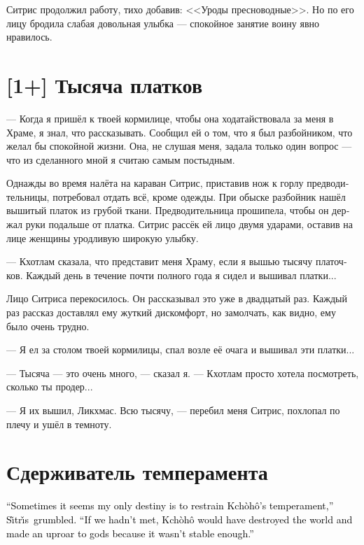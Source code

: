 \documentclass[a4paper,12pt,fleqn]{book}\usepackage{cooltooltips}\usepackage{polyglossia}\setdefaultlanguage[babelshorthands=true]{russian}\setotherlanguage{english}\defaultfontfeatures{Ligatures=TeX,Mapping=tex-text} \usepackage{xcolor}\definecolor{lightgray}{HTML}{bbbbbb}\color{lightgray}\newcommand{\ml}[3]{\textenglish{\textcolor{black}{#3}}}
\newcommand{\Kchoho}{Kch\`{o}h\^{o}}
\newcommand{\Sitris}{S\~{\i}tr\v{\i}s}
\begin{document}
{Ситрис продолжил работу, тихо добавив: <<Уроды пресноводные>>.
Но по его лицу бродила слабая довольная улыбка --- спокойное занятие воину явно нравилось.

\section{[1+] Тысяча платков}

--- Когда я пришёл к твоей кормилице, чтобы она ходатайствовала за меня в Храме, я знал, что рассказывать.
Сообщил ей о том, что я был разбойником, что желал бы спокойной жизни.
Она, не слушая меня, задала только один вопрос --- что из сделанного мной я считаю самым постыдным.

Однажды во время налёта на караван Ситрис, приставив нож к горлу предводительницы, потребовал отдать всё, кроме одежды.
При обыске разбойник нашёл вышитый платок из грубой ткани.
Предводительница прошипела, чтобы он держал руки подальше от платка.
Ситрис рассёк ей лицо двумя ударами, оставив на лице женщины уродливую широкую улыбку.

--- Кхотлам сказала, что представит меня Храму, если я вышью тысячу платочков.
Каждый день в течение почти полного года я сидел и вышивал платки...

Лицо Ситриса перекосилось.
Он рассказывал это уже в двадцатый раз.
Каждый раз рассказ доставлял ему жуткий дискомфорт, но замолчать, как видно, ему было очень трудно.

--- Я ел за столом твоей кормилицы, спал возле её очага и вышивал эти платки...

--- Тысяча --- это очень много, --- сказал я.
--- Кхотлам просто хотела посмотреть, сколько ты продер...

--- Я их вышил, Ликхмас.
Всю тысячу, --- перебил меня Ситрис, похлопал по плечу и ушёл в темноту.

\section{Сдерживатель темперамента}

\ml{$0$}
{--- Иногда мне кажется, что моё единственное предназначение --- сдерживать темперамент Кхохо, --- буркнул Ситрис.}
{``Sometimes it seems my only destiny is to restrain \Kchoho{}'s temperament,'' \Sitris\ grumbled.}
\ml{$0$}
{--- Если бы мы не встретились, Кхохо уничтожила бы мир к свиньям и устроила бы богам истерику, что мир так быстро сломался.}
{``If we hadn't met, \Kchoho{} would have destroyed the world and made an uproar to gods because it wasn't stable enough.''}

}
\end{document}
